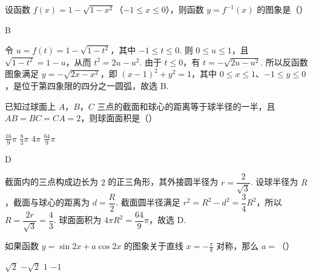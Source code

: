 \begin{problem}
设函数 \(f(x) = 1 - \sqrt{1 - x^2}\)（\(-1 \leqslant x \leqslant 0\)），则函数 \(y = f^{-1}(x)\) 的图象是（\quad）

    {}
    {}
    {}
\end{problem}

\begin{answer}
B
\end{answer}

\begin{solution}
令 \(u=f(t)=1-\sqrt{1-t^2}\)，其中 \(-1\leqslant t\leqslant0\). 则 \(0\leqslant u\leqslant1\)，且 \(\sqrt{1-t^2}=1-u\)，从而 \(t^2=2u-u^2\). 由于 \(t\leqslant0\)，有 \(t=-\sqrt{2u-u^2}\). 所以反函数图象满足 \(y=-\sqrt{2x-x^2}\)，即 \((x-1)^2+y^2=1\)，其中 \(0\leqslant x\leqslant1\)、\(-1\leqslant y\leqslant0\)，是位于第四象限的四分之一圆弧，故选 B.
\end{solution}

\begin{problem}
已知过球面上 \(A\)，\(B\)，\(C\) 三点的截面和球心的距离等于球半径的一半，且 \(AB = BC = CA = 2\)，则球面面积是（\quad）

\choices
    {\(\frac{16}{9}\pi\)}
    {\(\frac{8}{3}\pi\)}
    {\(4\pi\)}
    {\(\frac{64}{9}\pi\)}
\end{problem}

\begin{answer}
D
\end{answer}

\begin{solution}
截面内的三点构成边长为 \(2\) 的正三角形，其外接圆半径为 \(r=\dfrac{2}{\sqrt3}\). 设球半径为 \(R\)，截面与球心的距离为 \(d=\dfrac R2\). 截面圆半径满足 \(r^2=R^2-d^2=\dfrac34R^2\)，所以 \(R=\dfrac{2r}{\sqrt3}=\dfrac43\). 球面面积为 \(4\pi R^2=\dfrac{64}{9}\pi\)，故选 D.
\end{solution}

\begin{problem}
如果函数 \(y = \sin 2x + a \cos 2x \) 的图象关于直线 \(x = -\frac{\pi}{8} \) 对称，那么 \(a =\)（\quad）

\choices
    {\(\sqrt{2}\)}
    {\(-\sqrt{2}\)}
    {\(1\)}
    {\(-1\)}
\end{problem}

